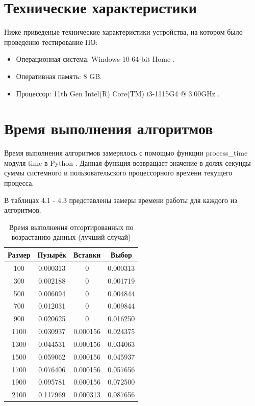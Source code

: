 \documentclass[12pt]{report}
\begin{document}
	\section{Технические характеристики}
	
	Ниже приведеные технические характеристики устройства, на котором было проведенно тестирование ПО:
	
	\begin{itemize}
		
		\item Операционная система: Windows 10 64-bit Home \cite{home}.
		
		\item Оперативная память: 8 GB.
		
		\item Процессор: 11th Gen Intel(R) Core(TM) i3-1115G4 @ 3.00GHz
		\cite{i3}.
		
	\end{itemize}
	
	\section{Время выполнения алгоритмов}
	Время выполнения алгоритмов замерялось с помощью функции process\_time модуля time в Python  \cite{process}. Данная функция возвращает значение в долях секунды суммы системного и пользовательского процессорного времени текущего процесса. \newline
	
	В таблицах 4.1 - 4.3 представлены замеры времени работы для каждого из алгоритмов.
	
	\begin{table} [h!]
		\caption{Время выполнения отсортированных по возрастанию данных (лучший случай)}
		\begin{center}
			\begin{tabular}{|c c c c|}
				\hline
				Размер & Пузырёк & Вставки  & Выбор \\
				\hline
				100 & 0.000313 & 0 & 0.000313 \\ 
				\hline 
				300 & 0.002188 & 0 & 0.001719 \\ 
				\hline 
				500 & 0.006094 & 0 & 0.004844 \\ 
				\hline 
				700 & 0.012031 & 0 & 0.009844 \\ 
				\hline 
				900 & 0.020625 & 0 & 0.016250 \\ 
				\hline 
				1100 & 0.030937 & 0.000156 & 0.024375 \\ 
				\hline 
				1300 & 0.044531 & 0.000156 & 0.034063 \\ 
				\hline 
				1500 & 0.059062 & 0.000156 & 0.045937 \\ 
				\hline 
				1700 & 0.076406 & 0.000156 & 0.057656 \\ 
				\hline 
				1900 & 0.095781 & 0.000156 & 0.072500 \\ 
				\hline 
				2100 & 0.117969 & 0.000313 & 0.087656 \\ 
				\hline 
			\end{tabular}
		\end{center}
	\end{table}
\end{document}
